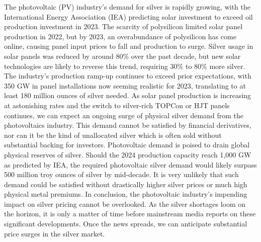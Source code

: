 \documentclass[11pt]{article}
\begin{document}
The photovoltaic (PV) industry's demand for silver is rapidly growing, with the International Energy Association (IEA) predicting solar investment to exceed oil production investment in 2023. The scarcity of polysilicon limited solar panel production in 2022, but by 2023, an overabundance of polysilicon has come online, causing panel input prices to fall and production to surge. Silver usage in solar panels was reduced by around 80\% over the past decade, but new solar technologies are likely to reverse this trend, requiring 30\% to 80\% more silver. The industry's production ramp-up continues to exceed prior expectations, with 350 GW in panel installations now seeming realistic for 2023, translating to at least 180 million ounces of silver needed. As solar panel production is increasing at astonishing rates and the switch to silver-rich TOPCon or HJT panels continues, we can expect an ongoing surge of physical silver demand from the photovoltaics industry. This demand cannot be satisfied by financial derivatives, nor can it be the kind of unallocated silver which is often sold without substantial backing for investors. Photovoltaic demand is poised to drain global physical reserves of silver. Should the 2024 production capacity reach 1,000 GW as predicted by IEA, the required photovoltaic silver demand would likely surpass 500 million troy ounces of silver by mid-decade. It is very unlikely that such demand could be satisfied without drastically higher silver prices or much high physical metal premiums. In conclusion, the photovoltaic industry's impending impact on silver pricing cannot be overlooked. As the silver shortages loom on the horizon, it is only a matter of time before mainstream media reports on these significant developments. Once the news spreads, we can anticipate substantial price surges in the silver market.
\end{document}
